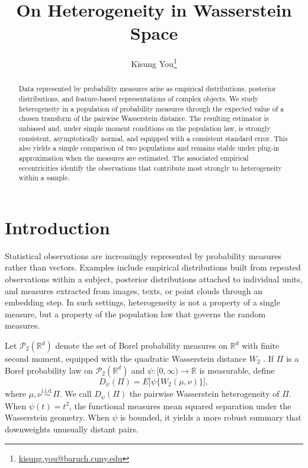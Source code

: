 \documentclass[10pt]{article}
\newcommand{\R}{\mathbb{R}}
\newcommand{\Ptwo}{\mathcal{P}_2(\R^d)}
\newcommand{\W}{W_2}
\newcommand{\iid}{\text{i.i.d.}}
\begin{document}
	
\title{On Heterogeneity in Wasserstein Space}
\author[1]{Kisung You\footnote{\url{kisung.you@baruch.cuny.edu}}}
\date{}

\maketitle
\begin{abstract}
Data represented by probability measures arise as empirical distributions, posterior distributions, and feature-based representations of complex objects. We study heterogeneity in a population of probability measures through the expected value of a chosen transform of the pairwise Wasserstein distance. The resulting estimator is unbiased and, under simple moment conditions on the population law, is strongly consistent, asymptotically normal, and equipped with a consistent standard error. This also yields a simple comparison of two populations and remains stable under plug-in approximation when the measures are estimated. The associated empirical eccentricities identify the observations that contribute most strongly to heterogeneity within a sample.
\end{abstract}




\section{Introduction}

Statistical observations are increasingly represented by probability measures rather than vectors. Examples include empirical distributions built from repeated observations within a subject, posterior distributions attached to individual units, and measures extracted from images, texts, or point clouds through an embedding step. In such settings, heterogeneity is not a property of a single measure, but a property of the population law that governs the random measures.

Let $\Ptwo$ denote the set of Borel probability measures on $\R^d$ with finite second moment, equipped with the quadratic Wasserstein distance $\W$ \citep{villani_2003_TopicsOptimalTransportation,villani_2009_OptimalTransportOld}. If $\Pi$ is a Borel probability law on $\Ptwo$ and $\psi\colon [0,\infty)\to\R$ is measurable, define
\begin{equation}
D_{\psi}(\Pi)=E\bigl[\psi\{\W(\mu,\nu)\}\bigr],
\label{eq:Dpsi}
\end{equation}
where $\mu,\nu\stackrel{\iid}{\sim}\Pi$. We call $D_{\psi}(\Pi)$ the pairwise Wasserstein heterogeneity of $\Pi$. When $\psi(t)=t^2$, the functional measures mean squared separation under the Wasserstein geometry. When $\psi$ is bounded, it yields a more robust summary that downweights unusually distant pairs.
\end{document}
